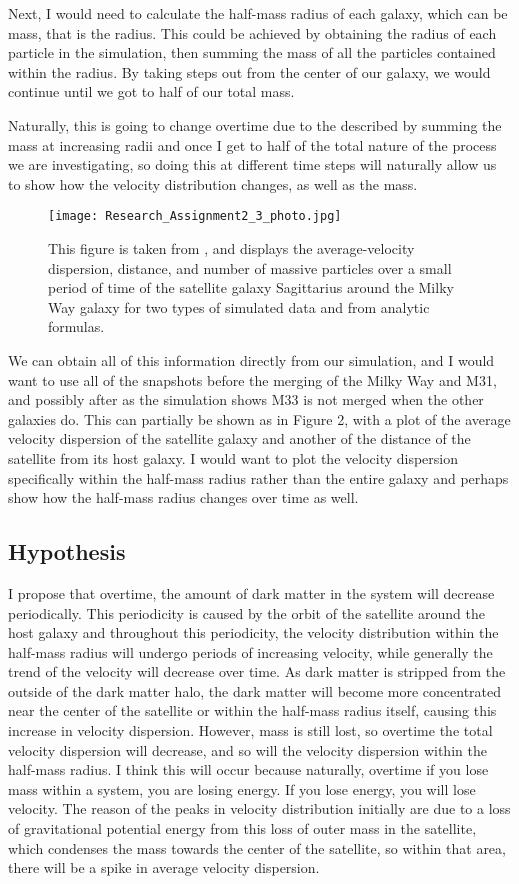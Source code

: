 \documentclass{aastex7}
\begin{document}
Next, I would need to calculate the half-mass radius of each galaxy, which can be 
mass, that is the radius. This could be achieved by obtaining the radius of each particle in the simulation, then summing the mass of all the particles contained within 
the radius. By taking steps out from the center of our galaxy, we would continue until 
we got to half of our total mass. 

Naturally, this is going to change overtime due to the 
described by summing the mass at increasing radii and once I get to half of the total 
nature of the process we are investigating, so doing this at different time steps will naturally allow us to show how the velocity distribution changes, as well as the mass.
\begin{figure}[h]
    \centering
    \texttt{[image: Research\_Assignment2\_3\_photo.jpg]}
    \caption{This figure is taken from \cite{Wang_2022}, and displays the average-velocity dispersion, distance, and number of massive particles over a small period of time of the satellite galaxy Sagittarius around the Milky Way galaxy for two types of simulated data and from analytic formulas.}
    \label{Figure 2}
\end{figure}
We can obtain all of this information directly from our simulation, and I would want to use all of the snapshots before the merging of the Milky Way and M31, and possibly after as the simulation shows M33 is not merged when the other galaxies do. This can partially be shown as in Figure 2, with a plot of the average velocity dispersion of the satellite galaxy and another of the distance of the satellite from its host galaxy. I would want to plot the velocity dispersion specifically within the half-mass radius rather than the entire galaxy and perhaps show how the half-mass radius changes over time as well. 


\subsection{Hypothesis}
I propose that overtime, the amount of dark matter in the system will decrease periodically. This periodicity is caused by the orbit of the satellite around the host galaxy and throughout this periodicity, the velocity distribution within the half-mass radius will undergo periods of increasing velocity, while generally the trend of the velocity will decrease over time. As dark matter is stripped from the outside of the dark matter halo, the dark matter will become more concentrated near the center of the satellite or within the half-mass radius itself, causing this increase in velocity dispersion. However, mass is still lost, so overtime the total velocity dispersion will decrease, and so will the velocity dispersion within the half-mass radius. I think this will occur because naturally, overtime if you lose mass within a system, you are losing energy. If you lose energy, you will lose velocity. The reason of the peaks in velocity distribution initially are due to a loss of gravitational potential energy from this loss of outer mass in the satellite, which condenses the mass towards the center of the satellite, so within that area, there will be a spike in average velocity dispersion.
\end{document}
